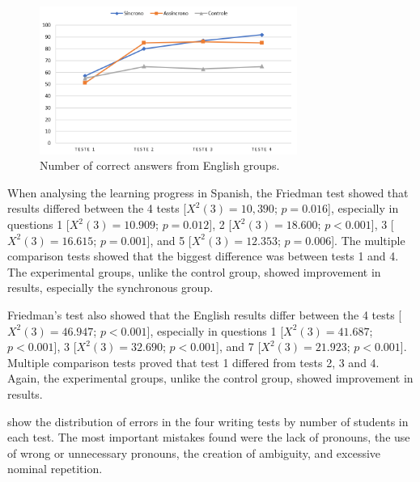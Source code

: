 \documentclass{textolivre}
\begin{document}
\begin{figure}[htbp]
 \centering
 \includegraphics[width=0.75\textwidth]{fig04.png}
 \caption{Number of correct answers from English groups.}
 \label{fig04}
\end{figure}




When analysing the learning progress in Spanish, the Friedman test
\cite{friedman_comparison_1940} showed that results differed between the 4 tests
[$X^2(3) = 10,390$; $p = 0.016$], especially in questions 1 [$X^2(3) = 10.909$; 
$p = 0.012$], 2 [$X^2(3) = 18.600$; $p < 0.001$], 3
[$X^2(3) = 16.615$; $p = 0.001$], and 5 [$X^2(3) = 12.353$; $p = 0.006$].
The multiple comparison tests showed that the biggest difference was
between tests 1 and 4. The experimental groups, unlike the control
group, showed improvement in results, especially the synchronous group.

Friedman's test also showed that the English results differ between the
4 tests [$X^2(3) = 46.947$; $p < 0.001$], especially in
questions 1 [$X^2(3) = 41.687$; $p < 0.001$], 3 [$X^2(3) = 32.690$; 
$p < 0.001$], and 7 [$X^2(3) = 21.923$; $p < 0.001$]. 
Multiple comparison tests proved that test 1 differed from
tests 2, 3 and 4. Again, the experimental groups, unlike the control
group, showed improvement in results.

 show the distribution of errors in the four writing
tests by number of students in each test. The most important mistakes
found were the lack of pronouns, the use of wrong or unnecessary
pronouns, the creation of ambiguity, and excessive nominal repetition.
\end{document}
